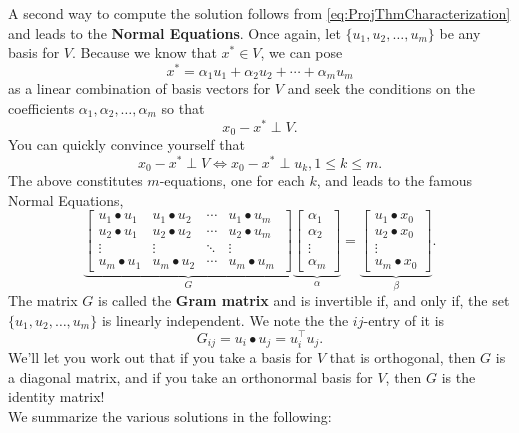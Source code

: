 A second way to compute the solution follows from \eqref{eq:ProjThmCharacterization} and leads to the \textbf{Normal Equations}. Once again, let $\{u_1, u_2, \ldots, u_m \}$ be any basis for $V$. Because we know that $x^\ast \in V$, we can pose 
\begin{equation}
    \label{eq:xstarInV}
    x^\ast = \alpha_1 u_1 + \alpha_2 u_2 + \cdots + \alpha_m u_m 
\end{equation}
as a linear combination of basis vectors for $V$ and seek the conditions on the coefficients $\alpha_1, \alpha_2, \ldots, \alpha_m$ so that
$$x_0 - x^\ast \perp V. $$
You can quickly convince yourself that 
$$x_0 - x^\ast \perp V \iff x_0 - x^\ast \perp u_k, 1 \le k \le m. $$
The above constitutes $m$-equations, one for each $k$, and leads to the famous Normal Equations,
\begin{equation}
    \label{eq:NormalEquations}
    \underbrace{\left[\begin{array}{cccc}
u_1 \bullet u_1 & u_1\bullet u_2 & \cdots & u_1 \bullet u_m \\
u_2 \bullet u_1 & u_2\bullet u_2 & \cdots & u_2 \bullet u_m \\
\vdots & \vdots & \ddots & \vdots \\
u_m \bullet u_1 & u_m\bullet u_2 & \cdots & u_m \bullet u_m \
    \end{array}  \right]}_{G} \underbrace{\begin{bmatrix}
    \alpha_1\\\alpha_2\\ \vdots \\ \alpha_m
    \end{bmatrix}}_{\alpha} = \underbrace{\begin{bmatrix}
    u_1 \bullet x_0\\ u_2 \bullet x_0 \\ \vdots \\ u_m \bullet x_0
    \end{bmatrix}}_{\beta}.
\end{equation}
The matrix $G$ is called the \textbf{Gram matrix} and is invertible if, and only if, the set $\{ u_1, u_2, \ldots, u_m\}$ is linearly independent. We note the the $ij$-entry of it is 
$$G_{ij}=u_i \bullet u_j = u_i^\top u_j. $$
We'll let you work out that if you take a basis for $V$ that is orthogonal, then $G$ is a diagonal matrix, and if you take an orthonormal basis for $V$, then $G$ is the identity matrix! \\

We summarize the various solutions in the following:
\vspace*{0.2cm}

